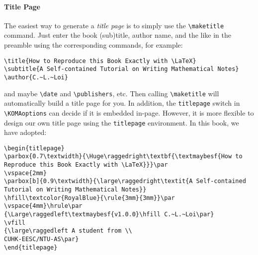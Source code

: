 \paragraph{Title Page}
The easiest way to generate a \textit{title page} is to simply use the \texttt{\textbackslash maketitle} command. Just enter the book (sub)title, author name, and the like in the preamble using the corresponding commands, for example:
\begin{lstlisting}
\title{How to Reproduce this Book Exactly with \LaTeX}
\subtitle{A Self-contained Tutorial on Writing Mathematical Notes}
\author{C.~L.~Loi}
\end{lstlisting}
and maybe \texttt{\textbackslash date} and \texttt{\textbackslash publishers}, etc. Then calling \texttt{\textbackslash maketitle} will automatically build a title page for you. In addition, the \texttt{titlepage} switch in \texttt{\textbackslash KOMAoptions} can decide if it is embedded in-page. However, it is more flexible to design our own title page using the \texttt{titlepage} environment. In this book, we have adopted:
\begin{lstlisting}
\begin{titlepage}
\parbox{0.7\textwidth}{\Huge\raggedright\textbf{\textmaybesf{How to Reproduce this Book Exactly with \LaTeX}}}\par
\vspace{2mm}
\parbox[b]{0.9\textwidth}{\large\raggedright\textit{A Self-contained Tutorial on Writing Mathematical Notes}}
\hfill\textcolor{RoyalBlue}{\rule{3mm}{3mm}}\par
\vspace{4mm}\hrule\par
{\Large\raggedleft\textmaybesf{v1.0.0}\hfill C.~L.~Loi\par}
\vfill
{\large\raggedleft A student from \\ 
CUHK-EESC/NTU-AS\par}
\end{titlepage}
\end{lstlisting}

